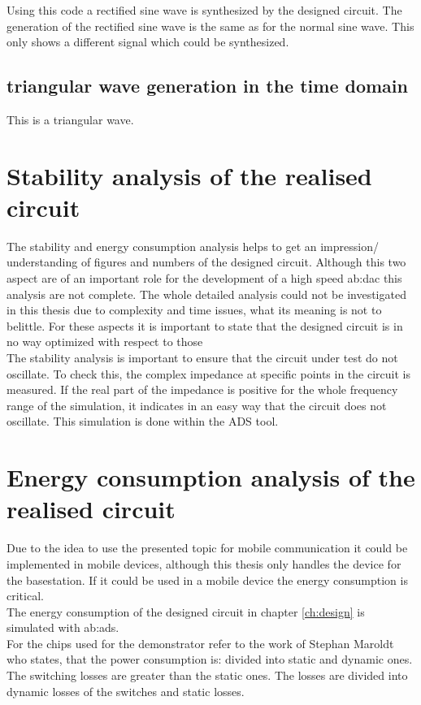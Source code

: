 Using this code a rectified sine wave is synthesized by the designed circuit.
The generation of the rectified sine wave is the same as for the normal sine wave. 
This only shows a different signal which could be synthesized.






\subsection{triangular wave generation in the time domain}
This is a triangular wave.


\section{Stability analysis of the realised circuit}
The stability and energy consumption analysis helps to get an impression/ understanding of figures and numbers of the designed circuit. Although this two aspect are of an important role for the development of a high speed \gls{ab:dac} this analysis are not complete. The whole detailed analysis could not be investigated in this thesis due to complexity and time issues, what its meaning is not to belittle. For these aspects it is important to state that the designed circuit is in no way optimized with respect to those \\
The stability analysis is important to ensure that the circuit under test do not oscillate. 
 To check this, the complex impedance at specific points in the circuit is measured.
 If the real part of the impedance is positive for the whole frequency range of the simulation, it indicates in an easy way that the circuit does not oscillate.
This simulation is done within the ADS tool. 

\section{Energy consumption analysis of the realised circuit}
Due to the idea to use the presented topic for mobile communication it could be implemented in mobile devices, although this thesis only handles the device for the basestation. If it could be used in a mobile device the energy consumption is critical.\\
The energy consumption of the designed circuit in chapter \ref{ch:design} is simulated with \gls{ab:ads}.\\
 For the chips used for the demonstrator refer to the work of Stephan Maroldt who states, that the power consumption is:  divided into static and dynamic ones. The switching losses are greater than the static ones.
The losses are divided into dynamic losses of the switches and static losses.

